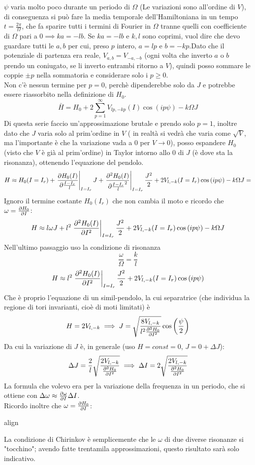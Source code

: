\documentclass[a4paper,12pt]{article}
\newcommand{\boxedeq}[2]{\begin{empheq}[box={\fboxsep=6pt\fbox}]{align}\label{#1}#2\end{empheq}}
\theoremstyle{plain}
\theoremstyle{definition}
\newcommand{\f}[2]{\frac{#1}{#2}}
\theoremstyle{remark}
\begin{document}
$\psi$ varia molto poco durante un periodo di $\Omega$ (Le variazioni sono all'ordine di $V$), di conseguenza si può fare la media temporale dell'Hamiltoniana in un tempo  $t=\f{2\pi}{\Omega}$, che fa sparire tutti i termini di Fourier in $\Omega$ tranne quelli con coefficiente di $\Omega$ pari a $0\implies ka=-lb$.
Se $ka =-lb$ e $k,l$ sono coprimi, vuol dire che devo guardare tutti le $a,b$ per cui, preso $p$ intero, $a=lp$ e $b=-kp$.Dato che il potenziale di partenza era reale, $V_{a,b}=V_{-a,-b}$ (ogni volta che inverto $a$ o $b$ prendo un coniugato, se li inverto entrambi ritorno a $V$), quindi posso sommare le coppie $\pm p$ nella sommatoria e considerare solo i $p\ge0$.\\Non c'è nessun termine per $p=0$, perchè dipenderebbe solo da $J$ e potrebbe essere riassorbito nella definizione di  $H_0$.
\[\bar{H}=H_0+2\sum_{p=1}^{\infty} V_{lp,-kp}(I) \cos\left({{ip} \psi}\right)-k\Omega J	\]
Di questa serie faccio un'approssimazione brutale e prendo solo $p=1$, inoltre  dato che $J$ varia solo al prim'ordine in $V$ ( in realtà si vedrà che varia come $\sqrt{V}$, ma l'importante è che la variazione vada a $0$ per $V\rightarrow0$), posso espandere $H_0$ (visto che $V$ è già al prim'ordine) in Taylor intorno allo 0 di $J$ (è dove sta la risonanza), ottenendo l'equazione del pendolo.
\[H\approx H_0(I=I_r)+\left.\pdv{H_0(I)}{\f{I-I_r}{l}}\right|_{I=I_r} J+\left.\pdv[2]{H_0(I)}{\f{I-I_r}{l}}\right|_{I=I_r} \f{J^2}{2}	+ 2V_{l,-k}(I=I_r) \cos\left({{ip} \psi}\right)-k\Omega J=	\]
Ignoro il termine costante $H_0(I_r)$ che non cambia il moto e ricordo che $\omega=\pdv{H_0}{I}$:
\[H\approx l \omega J+l^2	\left.\pdv[2]{H_0(I)}{I}\right|_{I=I_r} \f{J^2}{2}+ 2V_{l,-k}(I=I_r) \cos\left({{ip} \psi}\right)-k\Omega J	\]
Nell'ultimo passaggio uso la condizione di risonanza\[	\f{\omega}{\Omega}=\f{k}{l}\]
\[H\approx   l^2	\left.\pdv[2]{H_0(I)}{I}\right|_{I=I_r} \f{J^2}{2}+ 2V_{l,-k}(I=I_r) \cos\left({{ip} \psi}\right)\]
Che è proprio l'equazione di un simil-pendolo, la cui separatrice (che individua la regione di tori invarianti, cioè di moti limitati) è
\[H=2V_{l,-k}\implies J=\sqrt{\f{8 V_{l,-k}}{l^2\pdv[2]{H_0}{I}}}\cos\left(\f{\psi}{2}\right)\]
Da cui la variazione di $J$ è, in generale (uso $H=const=0$, $J=0+\Delta J$):
\[\Delta J=	\f{2}{l}\sqrt{\f{2 V_{l,-k}}{\pdv[2]{H_0}{I}}}\implies \Delta I=2\sqrt{\f{2 V_{l,-k}}{\pdv[2]{H_0}{I}}}	\]
La formula che volevo era per la variazione della frequenza in un periodo, che si ottiene con $\Delta \omega\approx \pdv{\omega }{I }\Delta I$.\\Ricordo inoltre che $\omega=\pdv{H_0}{I}$:
\boxedeq{Chiri}{\Delta {}\sqrt{{2 V_{l,-k}}{\pdv{\omega}{I}}} }
La condizione di Chirinkov è semplicemente che le $\omega$ di due diverse risonanze si "tocchino"; avendo fatte trentamila approssimazioni, questo risultato sarà solo indicativo.
\end{document}
